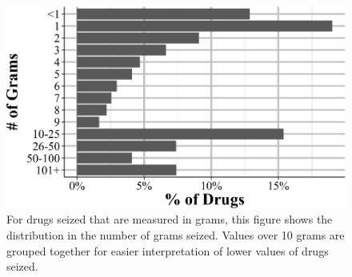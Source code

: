 \documentclass[
  12pt,
  openany]{book}
\begin{document}
\begin{figure}

{\centering \includegraphics[width=0.9\linewidth]{17_nibrs_property_files/figure-latex/propertyMarijuanaGramMeasures-1} 

}

\caption{For drugs seized that are measured in grams, this figure shows the distribution in the number of grams seized. Values over 10 grams are grouped together for easier interpretation of lower values of drugs seized.}\label{fig:propertyMarijuanaGramMeasures}
\end{figure}

\backmatter

  
\end{document}
